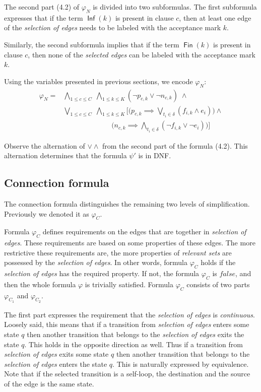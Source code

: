 \documentclass[a4paper,UKenglish,cleveref, autoref, thm-restate]{lipics-v2021}
\DeclareMathOperator{\Inf}{\mathsf{Inf}}
\DeclareMathOperator{\Fin}{\mathsf{Fin}}
\def\false{\mathit{false}}
\begin{document}
The second part (4.2) of $\varphi_{N}$ is divided into two subformulas. The first subformula expresses that if the term $\Inf(k)$ is present in clause $c$, then at least one edge of the \emph{selection of edges} needs to be labeled with the acceptance mark $k$.

Similarly, the second subformula implies that if the term $\Fin(k)$ is present in clause $c$, then none of the \emph{selected edges} can be labeled with the acceptance mark $k$.


Using the variables presented in previous sections, we encode $\varphi_{N}$:
\begin{align}
    \varphi_{N} = & \bigwedge\limits_{1 \leq c \leq C}\;\bigwedge\limits_{1 \leq k \leq K} (\lnot p_{c,k} \lor \lnot n_{c,k}) \; \land \\
    &\bigvee\limits_{1 \leq c \leq C} \; \bigwedge\limits_{1 \leq k \leq K} \Bigg[\big(  p_{c, k} \implies \bigvee\limits_{t_{i} \in \delta}(f_{i,k} \land e_{i})  \big) \land \\& \;\;\;\quad\quad\quad\quad\quad\quad\big(  n_{c, k} \implies \bigwedge\limits_{t_{i} \in \delta}(\lnot f_{i,k} \lor \lnot e_{i})  \big)\Bigg]
\end{align}

Observe the alternation of $\lor \land$ from the second part of the formula (4.2). This alternation determines that the formula $\psi'$ is in DNF. 

\subsection{Connection formula}
\label{subsection:connection}
The connection formula distinguishes the remaining two levels of simplification. Previously we denoted it as $\varphi_{C}$.

Formula $\varphi_{C}$ defines requirements on the edges that are together in \emph{selection of edges}. These requirements are based on some properties of these edges. The more restrictive these requirements are, the more properties of \emph{relevant sets} are possessed by the \emph{selection of edges}. 
In other words, formula $\varphi_{C}$ holds if the \emph{selection of edges} has the required property. If not, the formula $\varphi_{C}$ is $\false$, and then the whole formula $\varphi$ is trivially satisfied. Formula $\varphi_{C}$ consists of two parts $\varphi_{C_{1}}$ and $\varphi_{C_{2}}$.

The first part expresses the requirement that the \emph{selection of edges} is \emph{continuous}. Loosely said, this means that if a transition from \emph{selection of edges} enters some state $q$ then another transition that belongs to the \emph{selection of edges} exits the state $q$. This holds in the opposite direction as well. Thus if a transition from \emph{selection of edges} exits some state $q$ then another transition that belongs to the \emph{selection of edges} enters the state $q$. This is naturally expressed by equivalence. 
Note that if the selected transition is a self-loop, the destination and the source of the edge is the same state.
\end{document}

